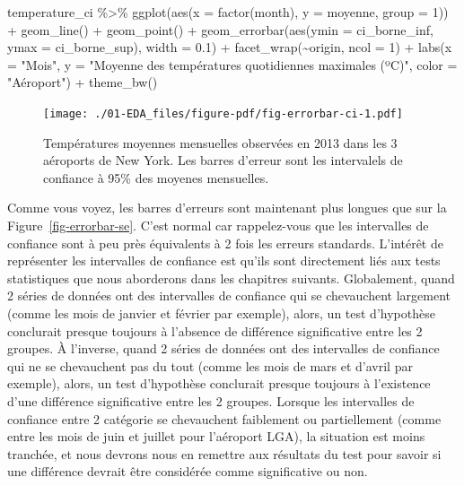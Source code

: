 \documentclass[
  a4paper,
  DIV=11,
  numbers=noendperiod,
  oneside]{scrreprt}
\newenvironment{Shaded}{}{}
\newcommand{\AttributeTok}[1]{\textcolor[rgb]{0.84,0.23,0.29}{#1}}
\newcommand{\DecValTok}[1]{\textcolor[rgb]{0.00,0.36,0.77}{#1}}
\newcommand{\FloatTok}[1]{\textcolor[rgb]{0.00,0.36,0.77}{#1}}
\newcommand{\FunctionTok}[1]{\textcolor[rgb]{0.44,0.26,0.76}{#1}}
\newcommand{\NormalTok}[1]{\textcolor[rgb]{0.14,0.16,0.18}{#1}}
\newcommand{\SpecialCharTok}[1]{\textcolor[rgb]{0.00,0.36,0.77}{#1}}
\newcommand{\StringTok}[1]{\textcolor[rgb]{0.01,0.18,0.38}{#1}}
\begin{document}
\begin{Shaded}
\begin{Highlighting}[]
\NormalTok{temperature\_ci }\SpecialCharTok{\%\textgreater{}\%} 
  \FunctionTok{ggplot}\NormalTok{(}\FunctionTok{aes}\NormalTok{(}\AttributeTok{x =} \FunctionTok{factor}\NormalTok{(month), }\AttributeTok{y =}\NormalTok{ moyenne, }\AttributeTok{group =} \DecValTok{1}\NormalTok{)) }\SpecialCharTok{+}
  \FunctionTok{geom\_line}\NormalTok{() }\SpecialCharTok{+}
  \FunctionTok{geom\_point}\NormalTok{() }\SpecialCharTok{+}
  \FunctionTok{geom\_errorbar}\NormalTok{(}\FunctionTok{aes}\NormalTok{(}\AttributeTok{ymin =}\NormalTok{ ci\_borne\_inf, }\AttributeTok{ymax =}\NormalTok{ ci\_borne\_sup), }\AttributeTok{width =} \FloatTok{0.1}\NormalTok{) }\SpecialCharTok{+}
  \FunctionTok{facet\_wrap}\NormalTok{(}\SpecialCharTok{\textasciitilde{}}\NormalTok{origin, }\AttributeTok{ncol =} \DecValTok{1}\NormalTok{) }\SpecialCharTok{+}
  \FunctionTok{labs}\NormalTok{(}\AttributeTok{x =} \StringTok{"Mois"}\NormalTok{, }
       \AttributeTok{y =} \StringTok{"Moyenne des températures quotidiennes maximales (ºC)"}\NormalTok{,}
       \AttributeTok{color =} \StringTok{"Aéroport"}\NormalTok{) }\SpecialCharTok{+}
  \FunctionTok{theme\_bw}\NormalTok{()}
\end{Highlighting}
\end{Shaded}

\begin{figure}[H]

{\centering \texttt{[image: ./01-EDA\_files/figure-pdf/fig-errorbar-ci-1.pdf]}

}

\caption{\label{fig-errorbar-ci}Températures moyennes mensuelles
observées en 2013 dans les 3 aéroports de New York. Les barres d'erreur
sont les intervalels de confiance à 95\% des moyenes mensuelles.}

\end{figure}

Comme vous voyez, les barres d'erreurs sont maintenant plus longues que
sur la Figure~\ref{fig-errorbar-se}. C'est normal car rappelez-vous que
les intervalles de confiance sont à peu près équivalents à 2 fois les
erreurs standards. L'intérêt de représenter les intervalles de confiance
est qu'ils sont directement liés aux tests statistiques que nous
aborderons dans les chapitres suivants. Globalement, quand 2 séries de
données ont des intervalles de confiance qui se chevauchent largement
(comme les mois de janvier et février par exemple), alors, un test
d'hypothèse conclurait presque toujours à l'absence de différence
significative entre les 2 groupes. À l'inverse, quand 2 séries de
données ont des intervalles de confiance qui ne se chevauchent pas du
tout (comme les mois de mars et d'avril par exemple), alors, un test
d'hypothèse conclurait presque toujours à l'existence d'une différence
significative entre les 2 groupes. Lorsque les intervalles de confiance
entre 2 catégorie se chevauchent faiblement ou partiellement (comme
entre les mois de juin et juillet pour l'aéroport LGA), la situation est
moins tranchée, et nous devrons nous en remettre aux résultats du test
pour savoir si une différence devrait être considérée comme
significative ou non.
\end{document}
